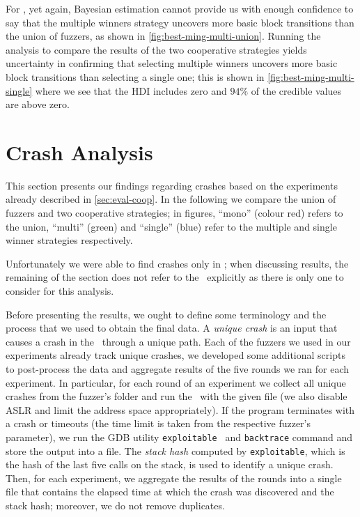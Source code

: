 For \listswf, yet again, Bayesian estimation cannot provide us with enough
confidence to say that the multiple winners strategy uncovers more basic block
transitions than the union of fuzzers, as shown in
\autoref{fig:best-ming-multi-union}. Running the analysis to compare the results
of the two cooperative strategies yields uncertainty in confirming that
selecting multiple winners uncovers more basic block transitions than selecting
a single one; this is shown in \autoref{fig:best-ming-multi-single} where we see
that the \ac{HDI} includes zero and $94\%$ of the credible values are above
zero.

\section{Crash Analysis}
\label{sec:eval-crashes}

This section presents our findings regarding crashes based on the experiments
already described in \autoref{sec:eval-coop}. In the following we compare the
union of fuzzers and two cooperative strategies; in figures, ``mono'' (colour
red) refers to the union, ``multi'' (green) and ``single'' (blue) refer to the
multiple and single winner strategies respectively.

Unfortunately we were able to find crashes only in \listswf; when discussing
results, the remaining of the section does not refer to the \sut\ explicitly as
there is only one to consider for this analysis.

Before presenting the results, we ought to define some terminology and the
process that we used to obtain the final data. A \emph{unique crash} is an input
that causes a crash in the \sut\ through a unique path. Each of the fuzzers we
used in our experiments already track unique crashes, we developed some
additional scripts to post-process the data and aggregate results of the five
rounds we ran for each experiment. In particular, for each round of an
experiment we collect all unique crashes from the fuzzer's folder and run the
\sut\ with the given file (we also disable \ac{ASLR} and limit the address space
appropriately). If the program terminates with a crash or timeouts (the time
limit is taken from the respective fuzzer's parameter), we run the GDB utility
\texttt{exploitable}~\cite{foote2013cert} and \texttt{backtrace} command and
store the output into a file. The \emph{stack hash} computed by
\texttt{exploitable}, which is the hash of the last five calls on the stack, is
used to identify a unique crash. Then, for each experiment, we aggregate the
results of the rounds into a single file that contains the elapsed time at which
the crash was discovered and the stack hash; moreover, we do not remove
duplicates.

